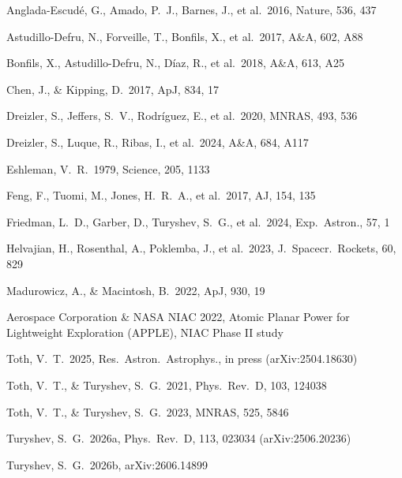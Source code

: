 \documentclass[twocolumn]{emulateapj}
\begin{document}
\begin{thebibliography}{}

Anglada-Escud\'e, G., Amado, P.~J., Barnes, J., et al.\ 2016, Nature, 536, 437

Astudillo-Defru, N., Forveille, T., Bonfils, X., et al.\ 2017, A\&A, 602, A88

Bonfils, X., Astudillo-Defru, N., D\'iaz, R., et al.\ 2018, A\&A, 613, A25

Chen, J., \& Kipping, D.\ 2017, ApJ, 834, 17

Dreizler, S., Jeffers, S.~V., Rodr\'iguez, E., et al.\ 2020, MNRAS, 493, 536

Dreizler, S., Luque, R., Ribas, I., et al.\ 2024, A\&A, 684, A117

Eshleman, V.~R.\ 1979, Science, 205, 1133

Feng, F., Tuomi, M., Jones, H.~R.~A., et al.\ 2017, AJ, 154, 135

Friedman, L.~D., Garber, D., Turyshev, S.~G., et al.\ 2024, Exp.\ Astron., 57, 1

Helvajian, H., Rosenthal, A., Poklemba, J., et al.\ 2023, J.\ Spacecr.\ Rockets, 60, 829

Madurowicz, A., \& Macintosh, B.\ 2022, ApJ, 930, 19

Aerospace Corporation \& NASA NIAC 2022, Atomic Planar Power for Lightweight Exploration (APPLE), NIAC Phase II study

Toth, V.~T.\ 2025, Res.\ Astron.\ Astrophys., in press (arXiv:2504.18630)

Toth, V.~T., \& Turyshev, S.~G.\ 2021, Phys.\ Rev.\ D, 103, 124038

Toth, V.~T., \& Turyshev, S.~G.\ 2023, MNRAS, 525, 5846

Turyshev, S.~G.\ 2026a, Phys.\ Rev.\ D, 113, 023034 (arXiv:2506.20236)

Turyshev, S.~G.\ 2026b, arXiv:2606.14899


\end{thebibliography}
\end{document}
